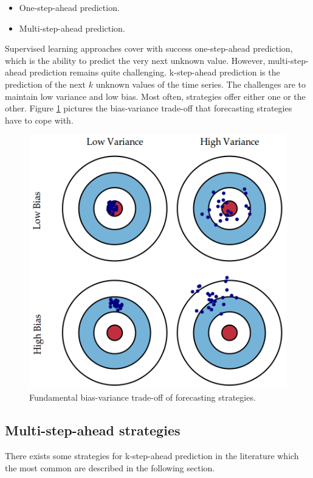 \documentclass[11pt,a4paper,oneside]{book}
\newenvironment{myitemize}
{ \begin{itemize}
    \setlength\itemsep{0pt}}
{ \end{itemize}                  }
\begin{document}
\begin{myitemize}
    \item One-step-ahead prediction.
    \item Multi-step-ahead prediction.
\end{myitemize}

Supervised learning approaches cover with success one-step-ahead prediction, which is the ability to predict the very next unknown value. However, multi-step-ahead prediction remains quite challenging.  k-step-ahead prediction is the prediction of the next $k$ unknown values of the time series. The challenges are to maintain low variance and low bias. Most often, strategies offer either one or the other. Figure \ref{fig:biasvariance} pictures the bias-variance trade-off that forecasting strategies have to cope with.


\begin{figure}[!h]
  \centering
    \includegraphics[scale=0.5]{img/bias-variance.png}
  \caption{Fundamental bias-variance trade-off of forecasting strategies. \cite{biaisvar}}
  \label{fig:biasvariance}
\end{figure}


\subsection{Multi-step-ahead strategies}

There exists some strategies for k-step-ahead prediction in the literature which the most common are described in the following section. \cite{Bonte}\cite{taiebonte}
\end{document}

